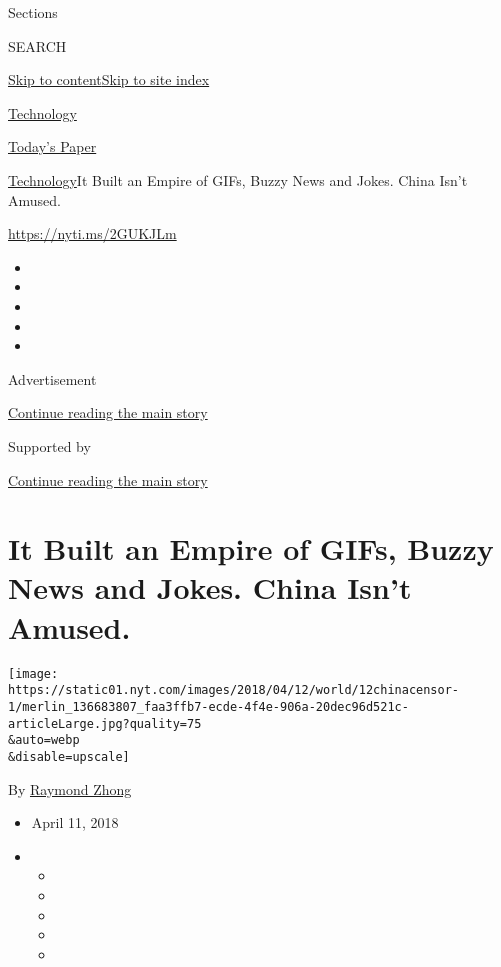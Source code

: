 Sections

SEARCH

\protect\hyperlink{site-content}{Skip to
content}\protect\hyperlink{site-index}{Skip to site index}

\href{https://www.nytimes.com/section/technology}{Technology}

\href{https://myaccount.nytimes.com/auth/login?response_type=cookie\&client_id=vi}{}

\href{https://www.nytimes.com/section/todayspaper}{Today's Paper}

\href{/section/technology}{Technology}\textbar{}It Built an Empire of
GIFs, Buzzy News and Jokes. China Isn't Amused.

\url{https://nyti.ms/2GUKJLm}

\begin{itemize}
\item
\item
\item
\item
\item
\end{itemize}

Advertisement

\protect\hyperlink{after-top}{Continue reading the main story}

Supported by

\protect\hyperlink{after-sponsor}{Continue reading the main story}

\hypertarget{it-built-an-empire-of-gifs-buzzy-news-and-jokes-china-isnt-amused}{%
\section{It Built an Empire of GIFs, Buzzy News and Jokes. China Isn't
Amused.}\label{it-built-an-empire-of-gifs-buzzy-news-and-jokes-china-isnt-amused}}

\texttt{[image: https://static01.nyt.com/images/2018/04/12/world/12chinacensor-1/merlin\_136683807\_faa3ffb7-ecde-4f4e-906a-20dec96d521c-articleLarge.jpg?quality=75\\\&auto=webp\\\&disable=upscale]}

By \href{https://www.nytimes.com/by/raymond-zhong}{Raymond Zhong}

\begin{itemize}
\item
  April 11, 2018
\item
  \begin{itemize}
  \item
  \item
  \item
  \item
  \item
  \end{itemize}
\end{itemize}

